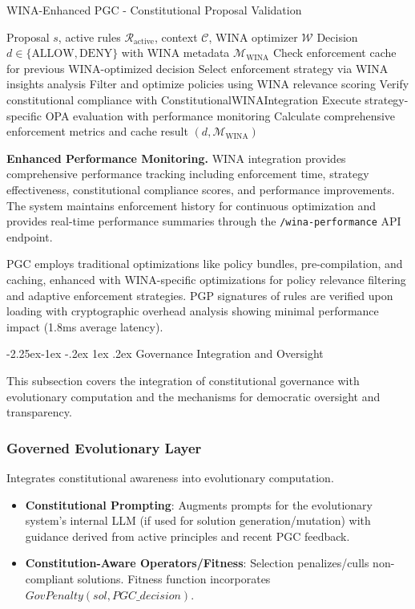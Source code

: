 \documentclass[manuscript,screen,review,anonymous,9pt]{acmart}
\makeatletter
\renewcommand\subsection{\@startsection{subsection}{2}{\z@}%
  {-2.25ex\@plus -1ex \@minus -.2ex}%
  {1ex \@plus .2ex}%
  {\normalfont\large\bfseries}}
\makeatother
\begin{document}
\begin{algorithm}[!htbp]
\caption{WINA-Enhanced PGC - Constitutional Proposal Validation}
\label{alg:wina_pgc_validation}
\begin{algorithmic}[1]
\Require Proposal $s$, active rules $\mathcal{R}_{\text{active}}$, context $\mathcal{C}$, WINA optimizer $\mathcal{W}$
\Ensure Decision $d \in \{\text{ALLOW}, \text{DENY}\}$ with WINA metadata $\mathcal{M}_{\text{WINA}}$
  \State Check enforcement cache for previous WINA-optimized decision
  \State Select enforcement strategy via WINA insights analysis
  \State Filter and optimize policies using WINA relevance scoring
  \State Verify constitutional compliance with ConstitutionalWINAIntegration
  \State Execute strategy-specific OPA evaluation with performance monitoring
  \State Calculate comprehensive enforcement metrics and cache result
  \State \Return $(d, \mathcal{M}_{\text{WINA}})$
\EndFunction
\end{algorithmic}
\end{algorithm}

\textbf{Enhanced Performance Monitoring.} WINA integration provides comprehensive performance tracking including enforcement time, strategy effectiveness, constitutional compliance scores, and performance improvements. The system maintains enforcement history for continuous optimization and provides real-time performance summaries through the \texttt{/wina-performance} API endpoint.

PGC employs traditional optimizations like policy bundles, pre-compilation, and caching, enhanced with WINA-specific optimizations for policy relevance filtering and adaptive enforcement strategies. PGP signatures of rules are verified upon loading with cryptographic overhead analysis showing minimal performance impact (1.8ms average latency).

\subsection{Governance Integration and Oversight}
\label{subsec:governance_integration}

This subsection covers the integration of constitutional governance with evolutionary computation and the mechanisms for democratic oversight and transparency.

\subsubsection{Governed Evolutionary Layer}
Integrates constitutional awareness into evolutionary computation.
\begin{itemize}
    \item \textbf{Constitutional Prompting}: Augments prompts for the evolutionary system's internal LLM (if used for solution generation/mutation) with guidance derived from active principles and recent PGC feedback.
    \item \textbf{Constitution-Aware Operators/Fitness}: Selection penalizes/culls non-compliant solutions. Fitness function incorporates $GovPenalty(sol, PGC\_decision)$.
\end{itemize}
\end{document}
